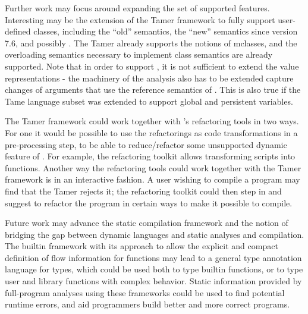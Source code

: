 Further work may focus around expanding the set of supported \matlab features.
Interesting may be the extension of the Tamer framework to fully support
\matlab user-defined classes, including the ``old'' semantics, the ``new''
semantics since version 7.6, and possibly . The \matlab Tamer
already supports the notions of mclasses, and the overloading semantics
necessary to implement class semantics are already supported. Note that in order
to support , it is not sufficient to extend the value representations -
the machinery of the analysis also has to be extended  capture changes of
arguments that use the reference semantics of . This is also
true if the Tame \matlab language subset was extended to support global and
persistent variables.

The Tamer framework could work together with \mclab's refactoring
tools in two ways. For one it would be possible to use the
refactorings as code transformations in a pre-processing step, to be
able to reduce/refactor some unsupported dynamic feature
of \matlab. For example, the refactoring toolkit allows
transforming \matlab scripts into \matlab functions. Another way the
refactoring tools could work together with the Tamer framework is in
an interactive fashion. A user wishing to compile a program
may find that the Tamer rejects it; the refactoring toolkit could
then step in and suggest to refactor the program in certain ways
to make it possible to compile.

Future work may advance the static compilation framework and the
notion of bridging the gap between dynamic languages and static
analyses and compilation.  The builtin framework with its approach to
allow the explicit and compact definition of flow information for functions
may lead to a general type annotation language for \matlab types, which could
be used both to type builtin functions, or to type user and library
functions with complex behavior. Static information provided by full-program
analyses using these frameworks could be used to find potential
runtime errors, and aid programmers build better and more correct programs.





